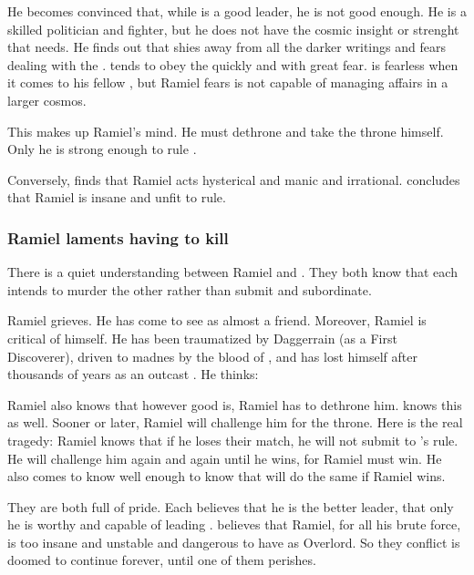 He becomes convinced that, while \Dasteron is a good leader, he is not good enough.
He is a skilled politician and fighter, but he does not have the cosmic insight or \vertex strenght that \Mystraacht needs.
He finds out that \Dasteron shies away from all the darker writings and fears dealing with the \banes.
\Dasteron tends to obey the \banes quickly and with great fear.
\Dasteron is fearless when it comes to his fellow \resphain, but Ramiel fears \Dasteron is not capable of managing \resphan affairs in a larger cosmos.

This makes up Ramiel's mind.
He must dethrone \Dasteron and take the throne himself.
Only he is strong enough to rule \Mystraacht. 

Conversely, \Dasteron finds that Ramiel acts hysterical and manic and irrational.
\Dasteron concludes that Ramiel is insane and unfit to rule. 





\subsubsection{Ramiel laments having to kill \Dasteron}
There is a quiet understanding between Ramiel and \Dasteron. 
They both know that each intends to murder the other rather than submit and subordinate. 

Ramiel grieves. 
He has come to see \Dasteron as almost a friend. 
Moreover, Ramiel is critical of himself. 
He has been traumatized by Daggerrain (as a First Discoverer), driven to madnes by the blood of \Nexagglachel, and has lost himself after thousands of years as an outcast \malach. 
He thinks:

Ramiel also knows that however good \Dasteron is, Ramiel has to dethrone him.
\Dasteron knows this as well.
Sooner or later, Ramiel will challenge him for the throne.
Here is the real tragedy:
Ramiel knows that if he loses their match, he will not submit to \Dasteron's rule.
He will challenge him again and again until he wins, for Ramiel must win.
He also comes to know \Dasteron well enough to know that \Dasteron will do the same if Ramiel wins.

They are both full of pride.
Each believes that he is the better leader, that only he is worthy and capable of leading \Mystraacht.
\Dasteron believes that Ramiel, for all his brute force, is too insane and unstable and dangerous to have as Overlord.
So they conflict is doomed to continue forever, until one of them perishes.

